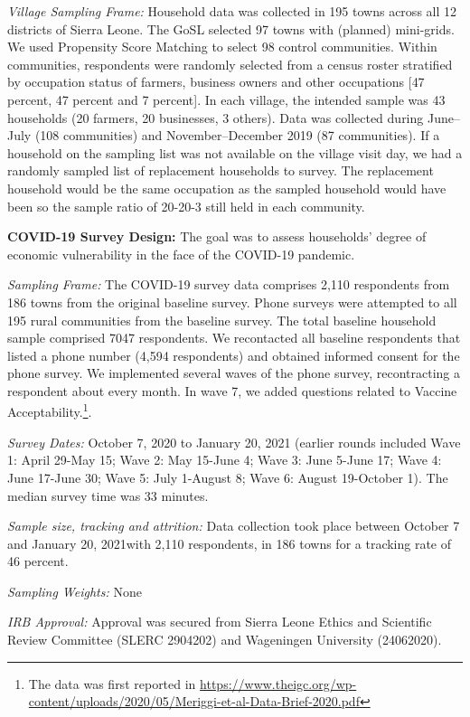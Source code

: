 \documentclass[
  12pt,
]{article}
\begin{document}
\emph{Village Sampling Frame:} Household data was collected in 195 towns across all 12 districts of Sierra Leone. The GoSL selected 97 towns with (planned) mini-grids. We used Propensity Score Matching to select 98 control communities. Within communities, respondents were randomly selected from a census roster stratified by occupation status of farmers, business owners and other occupations {[}47 percent, 47 percent and 7 percent{]}. In each village, the intended sample was 43 households (20 farmers, 20 businesses, 3 others). Data was collected during June--July (108 communities) and November--December 2019 (87 communities). If a household on the sampling list was not available on the village visit day, we had a randomly sampled list of replacement households to survey. The replacement household would be the same occupation as the sampled household would have been so the sample ratio of 20-20-3 still held in each community.

\textbf{COVID-19 Survey Design:} The goal was to assess households' degree of economic vulnerability in the face of the COVID-19 pandemic.

\emph{Sampling Frame:} The COVID-19 survey data comprises 2,110 respondents from 186 towns from the original baseline survey. Phone surveys were attempted to all 195 rural communities from the baseline survey. The total baseline household sample comprised 7047 respondents. We recontacted all baseline respondents that listed a phone number (4,594 respondents) and obtained informed consent for the phone survey. We implemented several waves of the phone survey, recontracting a respondent about every month. In wave 7, we added questions related to Vaccine Acceptability.\footnote{The data was first reported in \url{https://www.theigc.org/wp-content/uploads/2020/05/Meriggi-et-al-Data-Brief-2020.pdf}}.

\emph{Survey Dates:} October 7, 2020 to January 20, 2021 (earlier rounds included Wave 1: April 29-May 15; Wave 2: May 15-June 4; Wave 3: June 5-June 17; Wave 4: June 17-June 30; Wave 5: July 1-August 8; Wave 6: August 19-October 1). The median survey time was 33 minutes.

\emph{Sample size, tracking and attrition:} Data collection took place between October 7 and January 20, 2021with 2,110 respondents, in 186 towns for a tracking rate of 46 percent.

\emph{Sampling Weights:} None

\emph{IRB Approval:} Approval was secured from Sierra Leone Ethics and Scientific Review Committee (SLERC 2904202) and Wageningen University (24062020).
\end{document}
